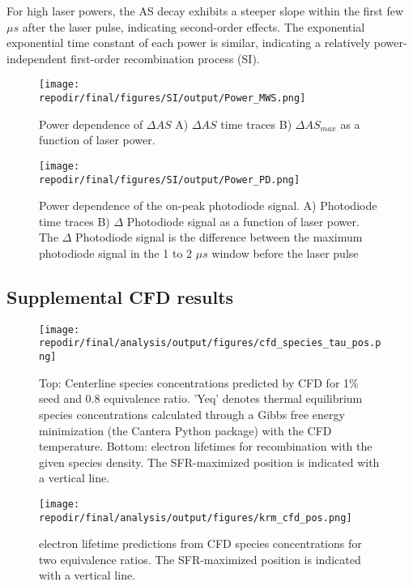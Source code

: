 For high laser powers, the AS decay exhibits a steeper slope within the first few $\mu s$ after the laser pulse, indicating second-order effects. The exponential exponential time constant of each power is similar, indicating a relatively power-independent first-order recombination process (SI).

\begin{figure}[h]
    \texttt{[image: \\repodir/final/figures/SI/output/Power\_MWS.png]} 
    \caption{Power dependence of $\Delta AS$ A) $\Delta AS$ time traces B) $\Delta AS_{max}$ as a function of laser power. }
    \label{fig:SI_power_dependence_AS}
\end{figure}



\begin{figure}[h]
    \texttt{[image: \\repodir/final/figures/SI/output/Power\_PD.png]} 
    \caption{Power dependence of the on-peak photodiode signal. A) Photodiode time traces B) $\Delta$ Photodiode signal as a function of laser power. The $\Delta$ Photodiode signal is the difference between the maximum photodiode signal in the 1 to 2 $\mu s$ window before the laser pulse}
    \label{fig:SI_power_dependence_PD}
\end{figure}

\clearpage

\subsection{Supplemental CFD results}

\begin{figure}[h]
    \texttt{[image: \\repodir/final/analysis/output/figures/cfd\_species\_tau\_pos.png]} 
    \caption{Top: Centerline species concentrations predicted by CFD for 1\% seed and 0.8 equivalence ratio. 'Yeq' denotes thermal equilibrium species concentrations calculated through a Gibbs free energy minimization (the Cantera Python package) with the CFD temperature.  Bottom:   
    electron lifetimes for recombination with the given species density. The SFR-maximized position is indicated with a vertical line.}
    \label{fig:SI_cfd_species_tau_pos}
\end{figure}

\begin{figure}[h]
    \texttt{[image: \\repodir/final/analysis/output/figures/krm\_cfd\_pos.png]} 
    \caption{electron lifetime predictions from CFD species concentrations for two equivalence ratios. The SFR-maximized position is indicated with a vertical line.}
    \label{fig:SI_krm_cfd_pos}
\end{figure}




